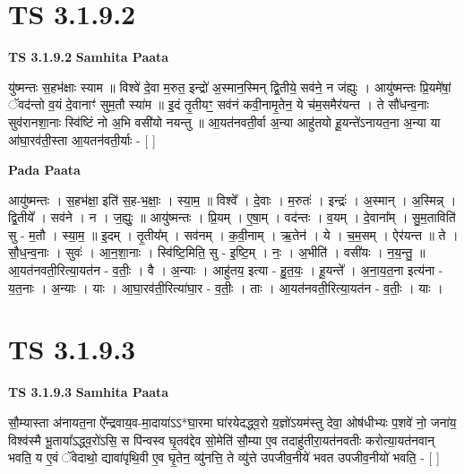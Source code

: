 \documentclass[17pt]{extarticle}
\begin{document}
\section*{ TS 3.1.9.2 }

\textbf{TS 3.1.9.2 } \newline
\textbf{Samhita Paata} \newline

यु॑ष्मन्तः स॒हभ॑क्षाः स्याम ॥ विश्वे॑ दे॒वा म॒रुत॒ इन्द्रो॑ अ॒स्मान॒स्मिन् द्वि॒तीये॒ सव॑ने॒ न ज॑ह्युः । आयु॑ष्मन्तः प्रि॒यमे॑षां॒ ॅवद॑न्तो व॒यं दे॒वानाꣳ॑ सुम॒तौ स्या॑म ॥ इ॒दं तृ॒तीयꣳ॒॒ सव॑नं कवी॒नामृ॒तेन॒ ये च॑म॒समैर॑यन्त । ते सौ॑धन्व॒नाः सुव॑रानशा॒नाः स्वि॑ष्टिं नो अ॒भि वसी॑यो नयन्तु ॥ आ॒यत॑नवती॒र्वा अ॒न्या आहु॑तयो हू॒यन्ते॑ऽनायत॒ना अ॒न्या या आ॑घा॒रव॑ती॒स्ता आ॒यतन॑वती॒र्याः - [  ] \newline

\textbf{Pada Paata} \newline

आयु॑ष्मन्तः । स॒हभ॑क्षा॒ इति॑ स॒ह-भ॒क्षाः॒ । स्या॒म॒ ॥ विश्वे᳚ । दे॒वाः । म॒रुतः॑ । इन्द्रः॑ । अ॒स्मान् । अ॒स्मिन्न् । द्वि॒तीये᳚ । सव॑ने । न । ज॒ह्युः॒ ॥ आयु॑ष्मन्तः । प्रि॒यम् । ए॒षा॒म् । वद॑न्तः । व॒यम् । दे॒वाना᳚म् । सु॒म॒ताविति॑ सु - म॒तौ । स्या॒म॒ ॥ इ॒दम् । तृ॒तीय᳚म् । सव॑नम् । क॒वी॒नाम् । ऋ॒तेन॑ । ये । च॒म॒सम् । ऐर॑यन्त ॥ ते । सौ॒ध॒न्व॒नाः । सुवः॑ । आ॒न॒शा॒नाः । स्वि॑ष्टि॒मिति॒ सु - इ॒ष्टि॒म् । नः॒ । अ॒भीति॑ । वसी॑यः । न॒य॒न्तु॒ ॥ आ॒यत॑नवती॒रित्या॒यत॑न - व॒तीः॒ । वै । अ॒न्याः । आहु॑तय॒ इत्या - हु॒त॒यः॒ । हू॒यन्ते᳚ । अ॒ना॒य॒त॒ना इत्य॑ना - य॒त॒नाः । अ॒न्याः । याः । आ॒घा॒रव॑ती॒रित्या॑घा॒र - व॒तीः॒ । ताः । आ॒यत॑नवती॒रित्या॒यत॑न - व॒तीः॒ । याः ।  \newline




\section*{ TS 3.1.9.3 }

\textbf{TS 3.1.9.3 } \newline
\textbf{Samhita Paata} \newline

सौ॒म्यास्ता अ॑नायत॒ना ऐ᳚न्द्रवाय॒व-मा॒दाया॑ऽऽ*घा॒रमा घा॑रयेदद्ध्व॒रो य॒ज्ञो॑ऽयम॑स्तु देवा॒ ओष॑धीभ्यः प॒शवे॑ नो॒ जना॑य॒ विश्व॑स्मै भू॒ताया᳚ऽद्ध्व॒रो॑ऽसि॒ स पि॑न्वस्व घृ॒तव॑द्देव सो॒मेति॑ सौ॒म्या ए॒व तदाहु॑तीरा॒यत॑नवतीः करोत्या॒यत॑नवान् भवति॒ य ए॒वं ॅवेदाथो॒ द्यावा॑पृथि॒वी ए॒व घृ॒तेन॒ व्यु॑नत्ति॒ ते व्यु॑त्ते उपजीव॒नीये॑ भवत उपजीव॒नीयो॑ भवति॒ - [  ] \newline
\end{document}
